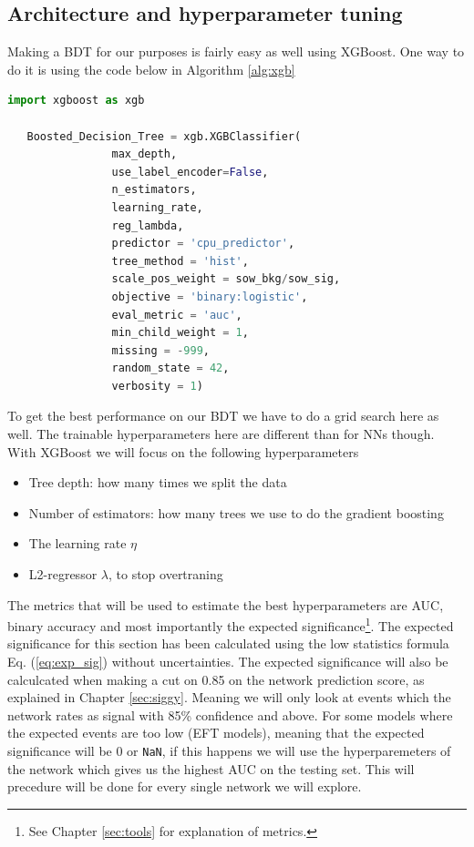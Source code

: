 \documentclass[12pt, a4paper]{book}
\begin{document}
\subsection{Architecture and hyperparameter tuning}\label{sec:BDTGriddy}
Making a BDT for our purposes is fairly easy as well using XGBoost. One way to do it is using the code below in Algorithm \ref{alg:xgb}
\begin{lstlisting}[basicstyle=\tiny, language=Python, caption={Boosted Decision Tree definition using XGBoost}, label=alg:xgb, captionpos=t]
   import xgboost as xgb
   
   Boosted_Decision_Tree = xgb.XGBClassifier(
                max_depth, 
                use_label_encoder=False,
                n_estimators,
                learning_rate,
                reg_lambda,
                predictor = 'cpu_predictor',
                tree_method = 'hist',
                scale_pos_weight = sow_bkg/sow_sig,
                objective = 'binary:logistic',
                eval_metric = 'auc',
                min_child_weight = 1,
                missing = -999,
                random_state = 42,
                verbosity = 1) 
\end{lstlisting}
To get the best performance on our BDT we have to do a grid search here as well. The trainable hyperparameters here are different than for NNs though. With XGBoost we will focus on the following hyperparameters
\begin{itemize}
   \item Tree depth: how many times we split the data
   \item Number of estimators: how many trees we use to do the gradient boosting
   \item The learning rate $\eta$
   \item L2-regressor $\lambda$, to stop overtraning
\end{itemize}
The metrics that will be used to estimate the best hyperparameters are AUC, binary accuracy and most importantly the expected significance\footnote{See Chapter \ref{sec:tools} for explanation of metrics.}.
The expected significance for this section has been calculated using the low statistics formula Eq. (\ref{eq:exp_sig}) without uncertainties. The expected significance will also be calculcated when making a cut on 0.85 on the network prediction score, as explained in Chapter \ref{sec:siggy}. 
Meaning we will only look at events which the network rates as signal with 85\% confidence and above. For some models where the expected events are too low (EFT models), meaning that the expected significance will be 0 or \verb|NaN|, if this happens we will use the hyperparemeters of the network 
which gives us the highest AUC on the testing set. This will precedure will be done for every single network we will explore.
\end{document}
